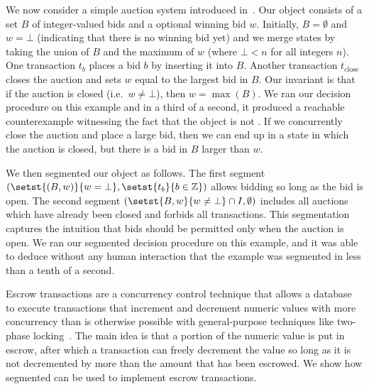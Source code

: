 \example[Auction]
We now consider a simple auction system introduced in~\cite{gotsman2016cause}.
Our object consists of a set $B$ of integer-valued bids and a optional winning
bid $w$. Initially, $B = \emptyset$ and $w = \bot$ (indicating that there is no
winning bid yet) and we merge states by taking the union of $B$ and the maximum
of $w$ (where $\bot < n$ for all integers $n$). One transaction $t_b$ places a
bid $b$ by inserting it into $B$. Another transaction $t_\text{close}$ closes
the auction and sets $w$ equal to the largest bid in $B$. Our invariant is that
if the auction is closed (i.e.\ $w \neq \bot$), then $w = \max(B)$. We ran our
decision procedure on this example and in a third of a second, it produced a
reachable counterexample witnessing the fact that the object is not
\invariantconfluent{}.  If we concurrently close the auction and place a large
bid, then we can end up in a state in which the auction is closed, but there is
a bid in $B$ larger than $w$.

We then segmented our object as follows. The first segment $(\setst{(B, w)}{w =
\bot}, \setst{t_b}{b \in \ints})$ allows bidding so long as the bid is open.
The second segment $(\setst{B, w}{w \neq \bot} \cap I, \emptyset)$ includes all
auctions which have already been closed and forbids all transactions. This
segmentation captures the intuition that bids should be permitted only when the
auction is open. We ran our segmented \invariantconfluence{} decision procedure
on this example, and it was able to deduce without any human interaction that
the example was segmented \invariantconfluent{} in less than a tenth of a
second.

Escrow transactions are a concurrency control technique that allows a database
to execute transactions that increment and decrement numeric values with more
concurrency than is otherwise possible with general-purpose techniques like
two-phase locking~\cite{o1986escrow}. The main idea is that a portion of the
numeric value is put in escrow, after which a transaction can freely decrement
the value so long as it is not decremented by more than the amount that has
been escrowed. We show how segmented \invariantconfluence{} can be used to
implement escrow transactions.

